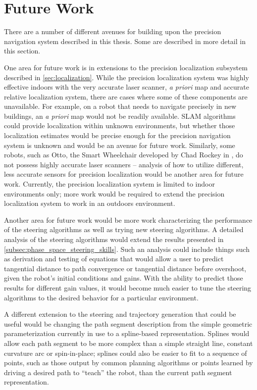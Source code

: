 \section{Future Work}\label{sec:future_work}

There are a number of different avenues for building upon the precision navigation system described in this thesis. Some are described in more detail in this section.

One area for future work is in extensions to the precision localization subsystem described in \autoref{sec:localization}. While the precision localization system was highly effective indoors with the very accurate laser scanner, \emph{a priori} map and accurate relative localization system, there are cases where some of these components are unavailable. For example, on a robot that needs to navigate precisely in new buildings, an \emph{a priori} map would not be readily available. SLAM algorithms could provide localization within unknown environments, but whether those localization estimates would be precise enough for the precision navigation system is unknown and would be an avenue for future work. Similarly, some robots, such as Otto, the Smart Wheelchair developed by Chad Rockey in \autocite{Rockey2012}, do not possess highly accurate laser scanners -- analysis of how to utilize different, less accurate sensors for precision localization would be another area for future work. Currently, the precision localization system is limited to indoor environments only; more work would be required to extend the precision localization system to work in an outdoors environment.

Another area for future work would be more work characterizing the performance of the steering algorithms as well as trying new steering algorithms. A detailed analysis of the steering algorithms would extend the results presented in \autoref{subsec:phase_space_steering_skills}. Such an analysis could include things such as derivation and testing of equations that would allow a user to predict tangential distance to path convergence or tangential distance before overshoot, given the robot's initial conditions and gains. With the ability to predict those results for different gain values, it would become much easier to tune the steering algorithms to the desired behavior for a particular environment. 

A different extension to the steering and trajectory generation that could be useful would be changing the path segment description from the simple geometric parameterization currently in use to a spline-based representation. Splines would allow each path segment to be more complex than a simple straight line, constant curvature arc or spin-in-place; splines could also be easier to fit to a sequence of points, such as those output by common planning algorithms or points learned by driving a desired path to ``teach'' the robot, than the current path segment representation.

